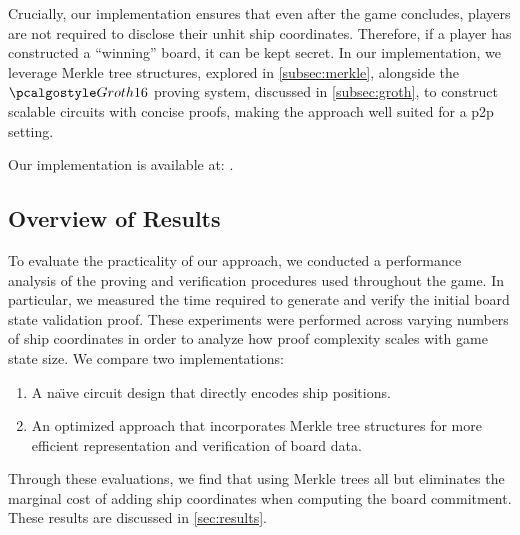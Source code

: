 Crucially, our implementation ensures that even after the game concludes, players are not required to disclose their unhit ship coordinates. Therefore, if a player has constructed a \enquote{winning} board, it can be kept secret. In our implementation, we leverage Merkle tree structures, explored in \cref{subsec:merkle}, alongside the $\groth$ proving system, discussed in \cref{subsec:groth}, to construct scalable circuits with concise proofs, making the approach well suited for a \gls{p2p} setting.

Our implementation is available at:  \cite{zkBattleship}.

\subsection{Overview of Results}

To evaluate the practicality of our approach, we conducted a performance analysis of the proving and verification procedures used throughout the game. In particular, we measured the time required to generate and verify the initial board state validation proof. These experiments were performed across varying numbers of ship coordinates in order to analyze how proof complexity scales with game state size. We compare two implementations:
\begin{enumerate}
    \item A na{\"\i}ve circuit design that directly encodes ship positions.
    \item An optimized approach that incorporates Merkle tree structures for more efficient representation and verification of board data.
\end{enumerate}
Through these evaluations, we find that using Merkle trees all but eliminates the marginal cost of adding ship coordinates when computing the board commitment. These results are discussed in \cref{sec:results}.
